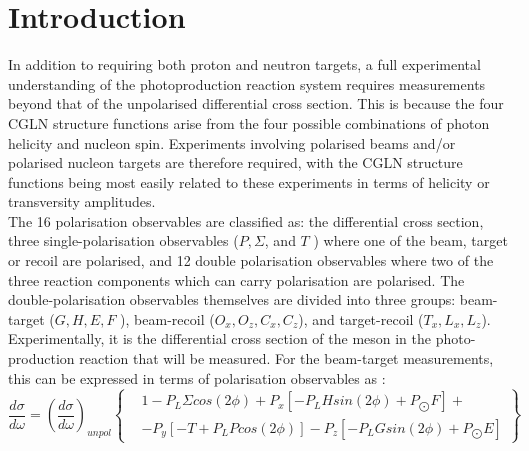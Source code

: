 \section{Introduction}
In addition to requiring both proton and neutron targets, a full experimental understanding of the photoproduction reaction system requires measurements
beyond that of the unpolarised differential cross section. This is because the four CGLN structure functions arise from the four possible combinations
of photon helicity and nucleon spin. Experiments involving polarised beams and/or polarised nucleon targets are therefore required, with the CGLN structure
functions being most easily related to these experiments in terms of helicity or transversity amplitudes. \\
The 16 polarisation observables are classified as: the differential cross section, three single-polarisation observables ($P, \Sigma$, and $T$ ) where one of the beam, target
or recoil are polarised, and 12 double polarisation observables where two of the three reaction components which can carry polarisation are polarised. The
double-polarisation observables themselves are divided into three groups: beam-target ($G, H, E, F$ ), beam-recoil ($O_x , O_z, C_x , C_z$), and target-recoil ($T_x , L_x , L_z$).
Experimentally, it is the differential cross section of the meson in the photo-production reaction that will be measured. For the beam-target measurements, this can be expressed in terms of polarisation observables as \cite{Bark_1974}:
\begin{equation}
\frac{d\sigma}{d\omega} = \left(\frac{d\sigma}{d\omega} \right)_{unpol}  \left\{ 
\begin{aligned}
    & 1 - P_L \Sigma cos(2\phi) + P_x \left[-P_L H sin(2\phi) + P_{\bigodot}F\right] + \\
& -P_y \left[ -T +P_L P cos(2\phi)\right] -P_z \left[-P_L G sin(2\phi) + P_{\bigodot}E\right]
\end{aligned}
\right\} 
\end{equation}
